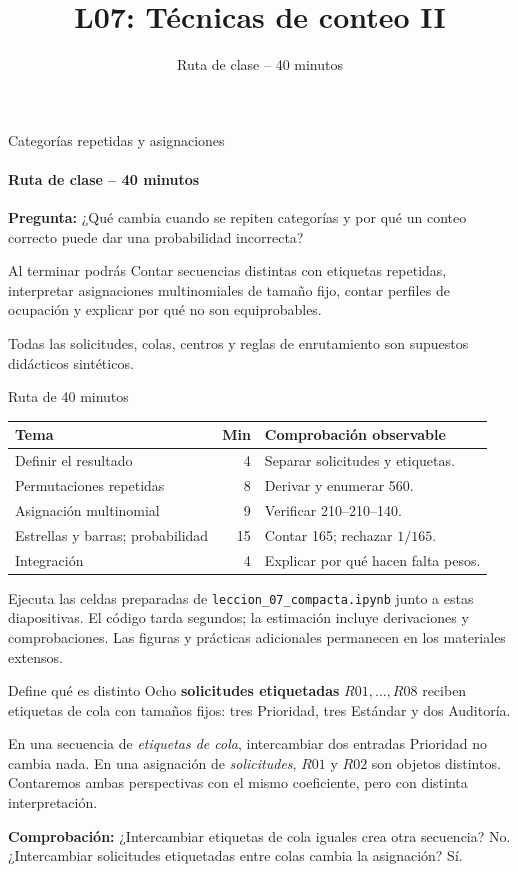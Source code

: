 \documentclass[aspectratio=169,10pt,spanish]{beamer}
\title{L07: Técnicas de conteo II}
\subtitle{Ruta de clase -- 40 minutos}
\author{}
\date{}
\begin{document}
\begin{frame}{Categorías repetidas y asignaciones}
\framesubtitle{Ruta de clase -- 40 minutos}
\textbf{Pregunta:} ¿Qué cambia cuando se repiten categorías y por qué un conteo correcto puede dar una probabilidad incorrecta?
\begin{block}{Al terminar podrás}
Contar secuencias distintas con etiquetas repetidas, interpretar asignaciones multinomiales de tamaño fijo, contar perfiles de ocupación y explicar por qué no son equiprobables.
\end{block}
\smallskip
Todas las solicitudes, colas, centros y reglas de enrutamiento son supuestos didácticos sintéticos.
\end{frame}

\begin{frame}{Ruta de 40 minutos}
\small
\begin{tabular}{p{.43\linewidth}rp{.38\linewidth}}
\toprule Tema & Min & Comprobación observable \\ \midrule
Definir el resultado & 4 & Separar solicitudes y etiquetas.\\
Permutaciones repetidas & 8 & Derivar y enumerar 560.\\
Asignación multinomial & 9 & Verificar 210--210--140.\\
Estrellas y barras; probabilidad & 15 & Contar 165; rechazar $1/165$.\\
Integración & 4 & Explicar por qué hacen falta pesos.\\ \bottomrule
\end{tabular}
\par\medskip
Ejecuta las celdas preparadas de \texttt{leccion\_07\_compacta.ipynb} junto a estas diapositivas. El código tarda segundos; la estimación incluye derivaciones y comprobaciones. Las figuras y prácticas adicionales permanecen en los materiales extensos.
\end{frame}

\begin{frame}{Define qué es distinto}
\small
Ocho \textbf{solicitudes etiquetadas} $R01,\ldots,R08$ reciben etiquetas de cola con tamaños fijos: tres Prioridad, tres Estándar y dos Auditoría.
\par\medskip
En una secuencia de \emph{etiquetas de cola}, intercambiar dos entradas Prioridad no cambia nada. En una asignación de \emph{solicitudes}, $R01$ y $R02$ son objetos distintos. Contaremos ambas perspectivas con el mismo coeficiente, pero con distinta interpretación.
\par\medskip
\textbf{Comprobación:} ¿Intercambiar etiquetas de cola iguales crea otra secuencia? No. ¿Intercambiar solicitudes etiquetadas entre colas cambia la asignación? Sí.
\end{frame}
\end{document}
